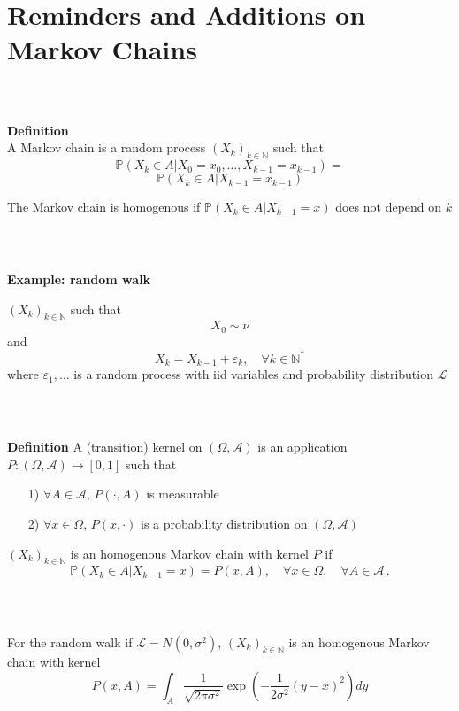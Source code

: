 \documentclass[notes,professionalfont,11pt,usenames,dvipsnames]{beamer}
\renewcommand{\mathcal}{\mathscr}
\newcommand{\vs}{\bigskip}
\renewcommand{\mathcal}{\mathscr}
\renewcommand{\epsilon}{\varepsilon}
\renewcommand{\P}{\mathbb{P}}
\newcommand\justify{\rightskip0pt \leftskip0pt}
\newenvironment{slide}
{\begin{frame}[environment=slide]
\frametitle{\insertsection \\ \insertsubsection}\justify\setlength{\parskip}{0.5cm}\vspace{-0.5cm}}
{\end{frame}}
\begin{document}
\section{Reminders and Additions on Markov Chains}

\begin{slide}

{\bf Definition} \\ A Markov chain is a random process $(X_k)_{k\in\mathbb{N}}$ such that
$$
\P(X_k\in A|X_0=x_0,\ldots,X_{k-1}=x_{k-1})=
$$
$$
\P(X_k\in A|X_{k-1}=x_{k-1})
$$


The Markov chain is homogenous if $\P(X_k\in A|X_{k-1}=x)$ does not depend on $k$

\end{slide}

\begin{slide}

{\bf Example: random walk}

\vs $(X_k)_{k\in\mathbb{N}}$ such that
$$
X_0\sim\nu
$$
and
$$
X_k=X_{k-1}+\epsilon_k,\quad\forall k\in\mathbb{N}^*
$$
where $\epsilon_1,\ldots$ is a random process with iid variables 
and probability distribution $\mathcal{L}$ 

\end{slide}

\begin{slide}

{\bf Definition} A (transition) kernel on $(\Omega,\mathcal{A})$ is an application 
$P:(\Omega,\mathcal{A})\longrightarrow [0,1]$ such that
\begin{itemize}
\item[1)] $\forall A\in\mathcal{A}$, $P(\cdot,A)$ is measurable
\item[2)] $\forall x\in\Omega$, $P(x,\cdot)$ is a probability distribution on 
$(\Omega,\mathcal{A})$
\end{itemize}


$(X_k)_{k\in\mathbb{N}}$ is an homogenous Markov chain with kernel $P$ if
$$
\P(X_k\in A|X_{k-1}=x)=P(x,A),\quad \forall x\in\Omega,\quad \forall A\in\mathcal{A}\,.
$$

\end{slide}

\begin{slide}

For the random walk if $\mathcal{L}=N(0,\sigma^2)$, $(X_k)_{k\in\mathbb{N}}$ 
is an homogenous Markov chain with kernel
$$
P(x,A)=\int_A \frac{1}{\sqrt{2\pi\sigma^2}}\exp\left(-\frac{1}{2\sigma^2}(y-x)^2\right)dy
$$

\end{slide}
\end{document}
